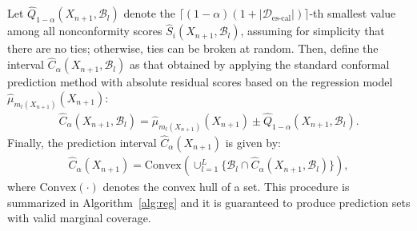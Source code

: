 Let $\hat{Q}_{1-\alpha}(X_{n+1},\mathcal{B}_l)$ denote the $\lceil (1-\alpha)(1+|\mathcal{D}_{\text{es-cal}}|) \rceil$-th smallest value among all nonconformity scores $\hat{S}_i(X_{n+1},\mathcal{B}_l)$, assuming for simplicity that there are no ties; otherwise, ties can be broken at random.
Then, define the interval $\hat{C}_{\alpha}(X_{n+1}, \mathcal{B}_l)$ as that obtained by applying the standard conformal prediction method with absolute residual scores based on the regression model $\hat{\mu}_{m_l(X_{n+1})}(X_{n+1})$:
\begin{align} \label{eq:reg-int-tmp}
  \hat{C}_{\alpha}(X_{n+1}, \mathcal{B}_l) = \hat{\mu}_{m_l(X_{n+1})}(X_{n+1}) \pm \hat{Q}_{1-\alpha}(X_{n+1},\mathcal{B}_l).
\end{align}
Finally, the prediction interval $\hat{C}_{\alpha}(X_{n+1})$ is given by:
\begin{align} \label{eq:reg-int}
  \hat{C}_{\alpha}(X_{n+1}) = \text{Convex}\left( \cup_{l=1}^{L} \{ \mathcal{B}_l \cap \hat{C}_{\alpha}(X_{n+1}, \mathcal{B}_l) \} \right),
\end{align}
where $\text{Convex}(\cdot)$ denotes the convex hull of a set.
This procedure is summarized in Algorithm~\ref{alg:reg} and it is guaranteed to produce prediction sets with valid marginal coverage.

